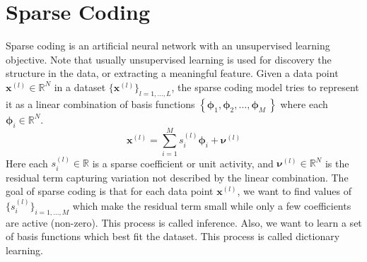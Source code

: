\section{Sparse Coding}

Sparse coding is an artificial neural network with an unsupervised learning objective. Note that usually unsupervised learning is used for discovery the structure in the data, or extracting a meaningful feature. Given a data point $\boldsymbol{x}^{(l)} \in \mathbb{R}^N$ in a dataset $\{\boldsymbol{x}^{(l)}\}_{l=1,\ldots,L}$, the sparse coding model tries to represent it as a linear combination of basis functions $\left\{ \boldsymbol{\phi}_1, \boldsymbol{\phi}_2, \ldots, \boldsymbol{\phi}_M\ \right\}$ where each $\boldsymbol{\phi}_i \in \mathbb{R}^N$. 
\begin{equation}
\label{eq:generative}
\boldsymbol{x}^{(l)} =
	\sum_{i=1}^M s_i^{(l)} \boldsymbol{\phi}_i + \boldsymbol{\nu}^{(l)}
\end{equation}
Here each $s_i^{(l)} \in \mathbb{R}$ is a sparse coefficient or unit activity, and $\boldsymbol{\nu}^{(l)} \in \mathbb{R}^N$ is the residual term capturing variation not described by the linear combination. The goal of sparse coding is that for each data point $\boldsymbol{x}^{(l)}$, we want to find values of $\{s_i^{(l)}\}_{i=1,\ldots,M}$ which make the residual term small while only a few coefficients are active (non-zero). This process is called inference. Also, we want to learn a set of basis functions which best fit the dataset. This process is called dictionary learning.

